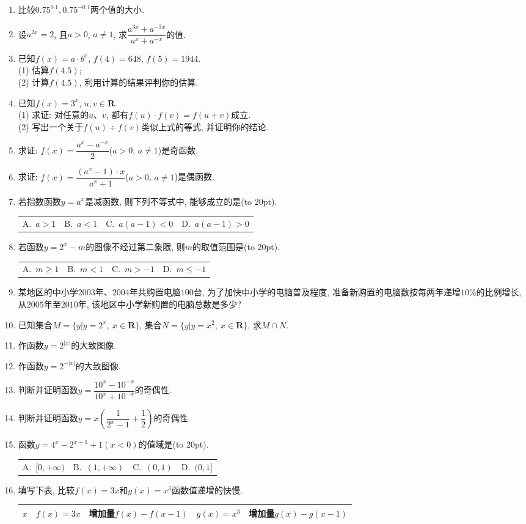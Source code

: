 \documentclass[10pt,a4paper]{article}
\newcommand{\bracket}[1]{(\hbox to #1pt{})}
\newcommand{\fourch}[4]{\par\begin{tabular}{p{.23\textwidth}p{.23\textwidth}p{.23\textwidth}p{.23\textwidth}}
A.~#1 &B.~#2& C.~#3& D.~#4
\end{tabular}}
\begin{document}
\begin{enumerate}[1.]
\item 比较$0.75^{0.1},0.75^{-0.1}$两个值的大小.
\item 设$a^{2x}=2$, 且$a>0$, $a\ne 1$, 求$\dfrac{a^{3x}+a^{-3x}}{a^x+a^{-x}}$的值.
\item 已知$f(x)=a\cdot b^x$, $f(4)=648$, $f(5)=1944$.\\
(1) 估算$f(4.5)$;\\
(2) 计算$f(4.5)$, 利用计算的结果评判你的估算.
\item 已知$f(x)=3^x$, $u,v\in \mathbf{R}$.\\
(1) 求证: 对任意的$u$、$v$, 都有$f(u)\cdot f(v)=f(u+v)$成立.\\
(2) 写出一个关于$f(u)\div f(v)$类似上式的等式, 并证明你的结论.
\item 求证: $f(x)=\dfrac{a^x-a^{-x}}2$($a>0$, $a\ne 1$)是奇函数.
\item 求证: $f(x)=\dfrac{(a^x-1)\cdot x}{a^x+1}$($a>0$, $a\ne 1$)是偶函数.
\item 若指数函数$y=a^x$是减函数, 则下列不等式中, 能够成立的是\bracket{20}.
\fourch{$a>1$}{$a<1$}{$a(a-1)<0$}{$a(a-1)>0$}
\item 若函数$y=2^x-m$的图像不经过第二象限, 则$m$的取值范围是\bracket{20}.
\fourch{$m\ge 1$}{$m<1$}{$m>-1$}{$m\le -1$}
\item 某地区的中小学$2003$年、$2004$年共购置电脑$100$台, 为了加快中小学的电脑普及程度, 准备新购置的电脑数按每两年递增$10\%$的比例增长, 从$2005$年至$2010$年, 该地区中小学新购置的电脑总数是多少?
\item 已知集合$M=\{y|y=2^x,\ x\in \mathbf{R}\}$, 集合$N=\{y|y=x^2,\ x\in \mathbf{R}\}$, 求$M\cap N$.
\item 作函数$y=2^{|x|}$的大致图像.
\item 作函数$y=2^{-|x|}$的大致图像.
\item 判断并证明函数$y=\dfrac{10^x-10^{-x}}{10^x+10^{-x}}$的奇偶性.
\item 判断并证明函数$y=x(\dfrac 1{2^x-1}+\dfrac 12)$的奇偶性.
\item 函数$y=4^x-2^{x+1}+1(x<0)$的值域是\bracket{20}.
\fourch{$[0,+\infty)$}{$(1,+\infty)$}{$(0,1)$}{$(0,1]$}
\item 填写下表, 比较$f(x)=3x$和$g(x)=x^3$函数值递增的快慢.
\begin{center}
    \begin{tabular}{|p{}<{\centering}|p{}<{\centering}|p{}<{\centering}|p{}<{\centering}|p{}<{\centering}|}
        \hline
        $x$ & $f(x)=3x$ & 增加量$f(x)-f(x-1)$ & $g(x)=x^3$ & 增加量$g(x)-g(x-1)$ \\ \hline

\end{tabular}
\end{center}
\end{enumerate}
\end{document}
